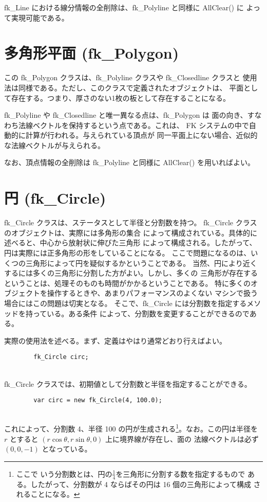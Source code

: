 fk\_Line における線分情報の全削除は、fk\_Polyline と同様に AllClear() に
よって実現可能である。

\section{多角形平面 (fk\_Polygon)}
この fk\_Polygon クラスは、fk\_Polyline クラスや fk\_Closedline クラスと
使用法は同様である。ただし、このクラスで定義されたオブジェクトは、
平面として存在する。つまり、厚さのない1枚の板として存在することになる。

fk\_Polyline や fk\_Closedline と唯一異なる点は、fk\_Polygon は
面の向き、すなわち法線ベクトルを保持するという点である。これは、
FK システムの中で自動的に計算が行われる。与えられている頂点が
同一平面上にない場合、近似的な法線ベクトルが与えられる。

なお、頂点情報の全削除は fk\_Polyline と同様に AllClear() を用いればよい。

\section{円 (fk\_Circle)}
fk\_Circle クラスは、ステータスとして半径と分割数を持つ。
fk\_Circle クラスのオブジェクトは、実際には多角形の集合
によって構成されている。具体的に述べると、中心から放射状に伸びた三角形
によって構成される。したがって、円は実際には正多角形の形をしていることになる。
ここで問題になるのは、いくつの三角形によって円を疑似するかということである。
当然、円により近くするには多くの三角形に分割した方がよい。しかし、多くの
三角形が存在するということは、処理そのものも時間がかかるということである。
特に多くのオブジェクトを操作するときや、あまりパフォーマンスのよくない
マシンで扱う場合にはこの問題は切実となる。
そこで、fk\_Circle には分割数を指定するメソッドを持っている。ある条件
によって、分割数を変更することができるのである。

実際の使用法を述べる。まず、定義はやはり通常どおり行えばよい。
\\
\begin{screen}
\begin{verbatim}
        fk_Circle circ;
\end{verbatim}
\end{screen}
~ \\
fk\_Circle クラスでは、初期値として分割数と半径を指定することができる。
\\
\begin{screen}
\begin{verbatim}
        var circ = new fk_Circle(4, 100.0);
\end{verbatim}
\end{screen}
~ \\
これによって、分割数 4、半径 100 の円が生成される\footnote{ここで
いう分割数とは、円の\(\frac{1}{4}\)を三角形に分割する数を指定するもので
ある。したがって、分割数が 4 ならばその円は 16 個の三角形によって構成
されることになる。}。なお。この円は半径を \(r\) とすると
\( (r\cos \theta , r\sin \theta , 0)\) 上に境界線が存在し、面の
法線ベクトルは必ず \((0, 0, -1)\) となっている。

